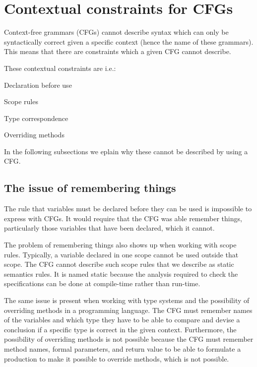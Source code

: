 \section{Contextual constraints for CFGs}
\label{sec:contextualconstraints}

Context-free grammars (CFGs) cannot describe syntax which can only be
syntactically correct given a specific context (hence the name of these
grammars). This means that there are constraints which a given CFG cannot
describe.

These contextual constraints are i.e.\cite[p. 39]{plpp}:

\begin{dlist}
\item Declaration before use
\item Scope rules
\item Type correspondence
\item Overriding methods
\end{dlist}

In the following subsections we eplain why these cannot be described by using a
CFG.


\subsection{The issue of remembering things}

The rule that variables must be declared before they can be used is impossible
to express with CFGs. It would require that the CFG was able remember things,
particularly those variables that have been declared, which it cannot. 

The problem of remembering things also shows up when working with scope rules.
Typically, a variable declared in one scope cannot be used outside that scope.
The CFG cannot describe such scope rules that we describe as static semantics
rules. It is named static because the analysis required to check the
specifications can be done at compile-time rather than run-time.
\cite[p. 153]{sebesta2013}

The same issue is present when working with type systems and the possibility of
overriding methods in a programming language. The CFG must remember names of the
variables and which type they have to be able to compare and devise a conclusion
if a specific type is correct in the given context. Furthermore, the possibility
of overriding methods is not possible because the CFG must remember method
names, formal parameters, and return value to be able to formulate a production
to make it possible to override methods, which is not possible. 

